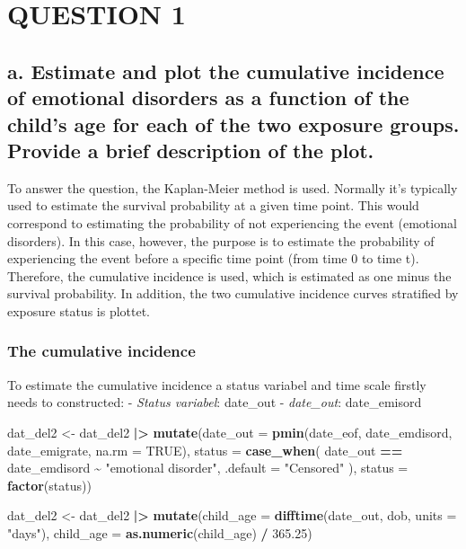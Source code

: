 \documentclass[
]{article}
\newenvironment{Shaded}{\begin{snugshade}}{\end{snugshade}}
\newcommand{\AttributeTok}[1]{\textcolor[rgb]{0.13,0.29,0.53}{#1}}
\newcommand{\ConstantTok}[1]{\textcolor[rgb]{0.56,0.35,0.01}{#1}}
\newcommand{\FloatTok}[1]{\textcolor[rgb]{0.00,0.00,0.81}{#1}}
\newcommand{\FunctionTok}[1]{\textcolor[rgb]{0.13,0.29,0.53}{\textbf{#1}}}
\newcommand{\NormalTok}[1]{#1}
\newcommand{\OtherTok}[1]{\textcolor[rgb]{0.56,0.35,0.01}{#1}}
\newcommand{\SpecialCharTok}[1]{\textcolor[rgb]{0.81,0.36,0.00}{\textbf{#1}}}
\newcommand{\StringTok}[1]{\textcolor[rgb]{0.31,0.60,0.02}{#1}}
\begin{document}
\section{QUESTION 1}\label{question-1}

\subsection{a. Estimate and plot the cumulative incidence of emotional
disorders as a function of the child's age for each of the two exposure
groups. Provide a brief description of the
plot.}\label{a.-estimate-and-plot-the-cumulative-incidence-of-emotional-disorders-as-a-function-of-the-childs-age-for-each-of-the-two-exposure-groups.-provide-a-brief-description-of-the-plot.}

To answer the question, the Kaplan-Meier method is used. Normally it's
typically used to estimate the survival probability at a given time
point. This would correspond to estimating the probability of not
experiencing the event (emotional disorders). In this case, however, the
purpose is to estimate the probability of experiencing the event before
a specific time point (from time 0 to time t). Therefore, the cumulative
incidence is used, which is estimated as one minus the survival
probability. In addition, the two cumulative incidence curves stratified
by exposure status is plottet.

\subsubsection{The cumulative incidence}\label{the-cumulative-incidence}

To estimate the cumulative incidence a status variabel and time scale
firstly needs to constructed: - \emph{Status variabel}: date\_out -
\emph{date\_out}: date\_emisord

\begin{Shaded}
\begin{Highlighting}[]
\NormalTok{dat\_del2 }\OtherTok{\textless{}{-}}\NormalTok{ dat\_del2 }\SpecialCharTok{|\textgreater{}}
  \FunctionTok{mutate}\NormalTok{(}\AttributeTok{date\_out =} \FunctionTok{pmin}\NormalTok{(date\_eof, date\_emdisord, date\_emigrate, }\AttributeTok{na.rm =} \ConstantTok{TRUE}\NormalTok{),}
         \AttributeTok{status =} \FunctionTok{case\_when}\NormalTok{(}
\NormalTok{           date\_out }\SpecialCharTok{==}\NormalTok{ date\_emdisord }\SpecialCharTok{\textasciitilde{}} \StringTok{"emotional disorder"}\NormalTok{,}
           \AttributeTok{.default =} \StringTok{"Censored"}
\NormalTok{         ),}
         \AttributeTok{status =} \FunctionTok{factor}\NormalTok{(status))}

\NormalTok{dat\_del2 }\OtherTok{\textless{}{-}}\NormalTok{ dat\_del2 }\SpecialCharTok{|\textgreater{}}
  \FunctionTok{mutate}\NormalTok{(}\AttributeTok{child\_age =} \FunctionTok{difftime}\NormalTok{(date\_out, dob, }\AttributeTok{units =} \StringTok{"days"}\NormalTok{),}
         \AttributeTok{child\_age =} \FunctionTok{as.numeric}\NormalTok{(child\_age) }\SpecialCharTok{/} \FloatTok{365.25}\NormalTok{)}
\end{Highlighting}
\end{Shaded}
\end{document}
